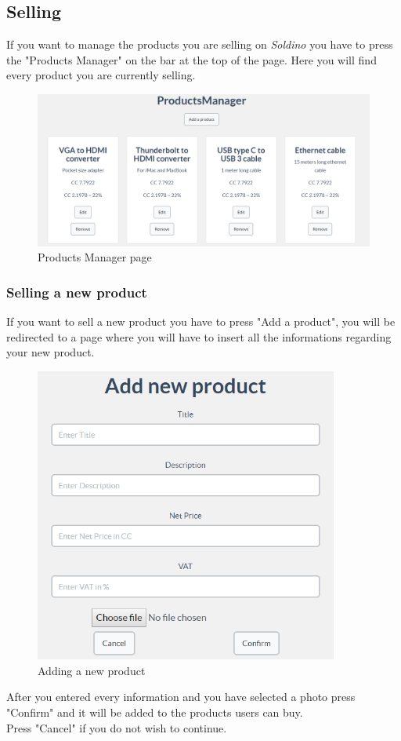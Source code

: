 	\subsection{Selling}
	If you want to manage the products you are selling on \textit{Soldino} you 
	have to press the "Products Manager" on the bar at the top of the page. 
	Here you will find every product you are currently selling.
	\begin{figure}[H]
		\includegraphics[width=15cm]{res/images/products_manager.png}
		\centering
		\caption{Products Manager page}
	\end{figure}
		\subsubsection{Selling a new product}
		If you want to sell a new product you have to press "Add a product", you 
		will be redirected to a page where you will have to insert all the 
		informations regarding your new product.
	\begin{figure}[H]
		\includegraphics[width=10cm]{res/images/add_new_product.png}
		\centering
		\caption{Adding a new product}
	\end{figure}
	\noindent After you entered every information and you have selected a photo press
	"Confirm" and it will be added to the products users can buy.
	\\Press "Cancel" if you do not wish to continue.
	
